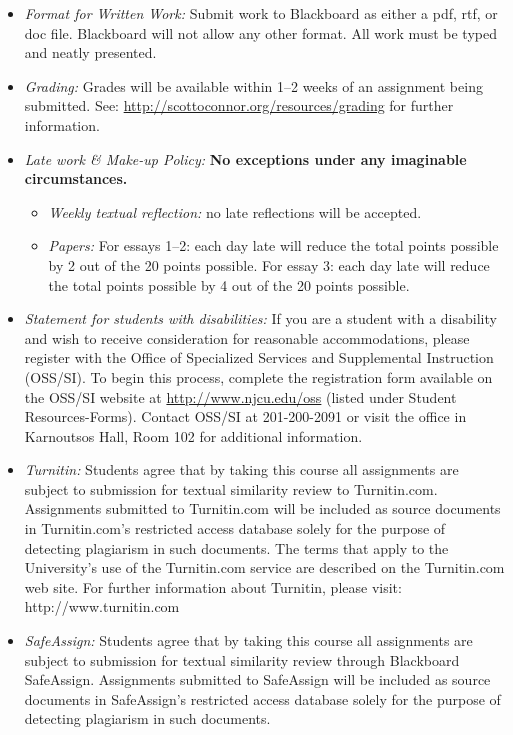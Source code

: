 \documentclass[article,oneside]{memoir}
\begin{document}
\begin{itemize}
\item \textit{Format for Written Work:} Submit work to Blackboard as either a pdf, rtf, or doc file. Blackboard will not allow any other format. All work must be typed and neatly presented. 


\item \textit{Grading:} Grades will be available within 1--2 weeks of an assignment being submitted. See: \href{http://scottoconnor.org/resources/grading}{http://scottoconnor.org/resources/grading} for further information.


\item \textit{Late work \& Make-up Policy:} \textbf{No exceptions under any imaginable circumstances.}
\begin{itemize}
\item \textit{Weekly textual reflection:} no late reflections will be accepted.


\item \textit{Papers: } For essays 1--2: each day late will reduce the total points possible by 2 out of the 20 points possible. For essay 3: each day late will reduce the total points possible by 4 out of the 20 points possible.

\end{itemize}

\item \textit{Statement for students with disabilities:} If you are a student
with a disability and wish to receive consideration for reasonable
accommodations, please register with the Office of Specialized Services
and Supplemental Instruction (OSS/SI). To begin this process, complete
the registration form available on the OSS/SI website at
\href{http://www.njcu.edu/oss}{http://www.njcu.edu/oss}
(listed under Student Resources-Forms). Contact OSS/SI at 201-200-2091
or visit the office in Karnoutsos Hall, Room 102 for additional
information.

\item \textit{Turnitin:} Students agree that by taking this course all assignments are subject to submission for textual similarity review to Turnitin.com. Assignments submitted to Turnitin.com will be included as source documents in Turnitin.com's restricted access database solely for the purpose of detecting plagiarism in such documents.  The terms that apply to the University’s use of the Turnitin.com service are described on the Turnitin.com web site.  For further information about Turnitin, please visit: http://www.turnitin.com 

\item \textit{SafeAssign:} Students agree that by taking this course all assignments are subject to submission for textual similarity review through Blackboard SafeAssign. Assignments submitted to SafeAssign will be included as source documents in SafeAssign's restricted access database solely for the purpose of detecting plagiarism in such documents.  


\end{itemize}
\end{document}

